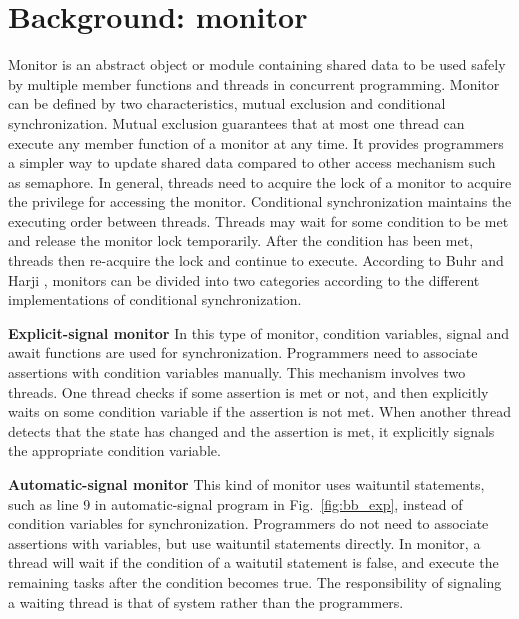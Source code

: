 \documentclass[preprint]{sigplanconf}
\begin{document}
\section{Background: monitor} \label{sec:bg} 
Monitor is an abstract object or module containing shared data to be used safely
by multiple member functions and threads in concurrent programming. Monitor can
be defined by two characteristics, mutual exclusion and conditional 
synchronization. Mutual exclusion guarantees that at most one thread can 
execute any member function of a monitor at any time. It provides programmers a 
simpler way to update shared data compared to other access mechanism
such as semaphore. In general, threads need to acquire the lock of a monitor 
to acquire the privilege for accessing the monitor. Conditional synchronization 
maintains the executing order between threads. Threads may wait for some 
condition to be met and release the monitor lock temporarily. After the 
condition has been met, threads then re-acquire the lock and continue to 
execute. According to Buhr and Harji \cite{bh05}, monitors can be divided into 
two categories according to the different implementations of conditional 
synchronization. 
\begin{description}
    \item{\bf Explicit-signal monitor} In this type of monitor, condition
    variables, signal and await functions are used for synchronization. 
    Programmers need to associate assertions with condition variables manually.
    This mechanism involves two threads. One thread checks if some
    assertion is met or not, and then explicitly waits on some condition variable 
    if the assertion is not met. When another thread detects that the state has 
    changed and the assertion is met, it explicitly signals the 
    appropriate condition variable.
    \item{\bf Automatic-signal monitor} This kind of monitor uses waituntil
    statements, such as line 9 in automatic-signal program in
    Fig.~\ref{fig:bb_exp}, instead of condition variables for
    synchronization. Programmers do not need to associate assertions with
    variables, but use waituntil statements directly. In
    monitor, a thread will wait if the condition of a waitutil
    statement is false, and execute the remaining tasks after the condition 
    becomes true. The responsibility of signaling a waiting thread is that of 
    system rather than the programmers. 
\end{description}
\end{document}
